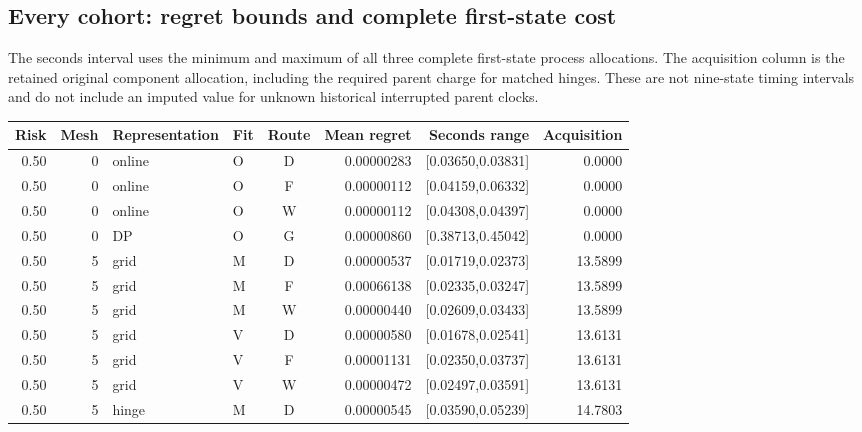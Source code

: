 \subsection{Every cohort: regret bounds and complete first-state cost}

The seconds interval uses the minimum and maximum of all three complete first-state process allocations. The acquisition column is the retained original component allocation, including the required parent charge for matched hinges. These are not nine-state timing intervals and do not include an imputed value for unknown historical interrupted parent clocks.

\begingroup\small\setlength{\tabcolsep}{2.5pt}

\begin{longtable}{rrllcrrr}\toprule

Risk & Mesh & Representation & Fit & Route & Mean regret & Seconds range & Acquisition\\\midrule\endhead

0.50 & 0 & online & O & D & 0.00000283 & [0.03650,0.03831] & 0.0000 \\

0.50 & 0 & online & O & F & 0.00000112 & [0.04159,0.06332] & 0.0000 \\

0.50 & 0 & online & O & W & 0.00000112 & [0.04308,0.04397] & 0.0000 \\

0.50 & 0 & DP & O & G & 0.00000860 & [0.38713,0.45042] & 0.0000 \\

0.50 & 5 & grid & M & D & 0.00000537 & [0.01719,0.02373] & 13.5899 \\

0.50 & 5 & grid & M & F & 0.00066138 & [0.02335,0.03247] & 13.5899 \\

0.50 & 5 & grid & M & W & 0.00000440 & [0.02609,0.03433] & 13.5899 \\

0.50 & 5 & grid & V & D & 0.00000580 & [0.01678,0.02541] & 13.6131 \\

0.50 & 5 & grid & V & F & 0.00001131 & [0.02350,0.03737] & 13.6131 \\

0.50 & 5 & grid & V & W & 0.00000472 & [0.02497,0.03591] & 13.6131 \\

0.50 & 5 & hinge & M & D & 0.00000545 & [0.03590,0.05239] & 14.7803 \\


\end{longtable}
